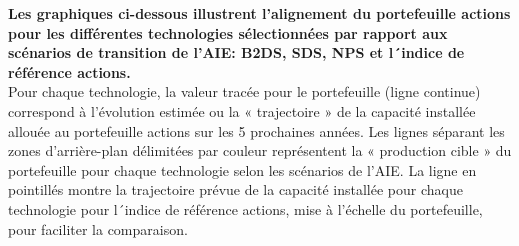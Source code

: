\documentclass[10pt,table,a4]{article}\usepackage[]{graphicx}\usepackage[]{color}
\begin{document}
	\begin{multicols}{2}
		\textbf{Les graphiques ci-dessous illustrent l'alignement du portefeuille actions pour les différentes technologies sélectionnées par rapport aux scénarios de transition de l'AIE: B2DS, SDS, NPS  et l´indice de référence actions.}\\
		Pour chaque technologie, la valeur tracée pour le portefeuille (ligne continue) correspond à l'évolution estimée ou la « trajectoire » de la capacité installée allouée au portefeuille actions sur les 5 prochaines années.
		Les lignes séparant les zones d'arrière-plan délimitées par couleur représentent la « production cible » du portefeuille pour chaque technologie selon les scénarios de l'AIE. La ligne en pointillés montre la trajectoire prévue de la capacité installée pour chaque technologie pour l´indice de référence actions, mise à l'échelle du portefeuille, pour faciliter la comparaison.
		                    
		
	\end{multicols}		
	
\end{document}
